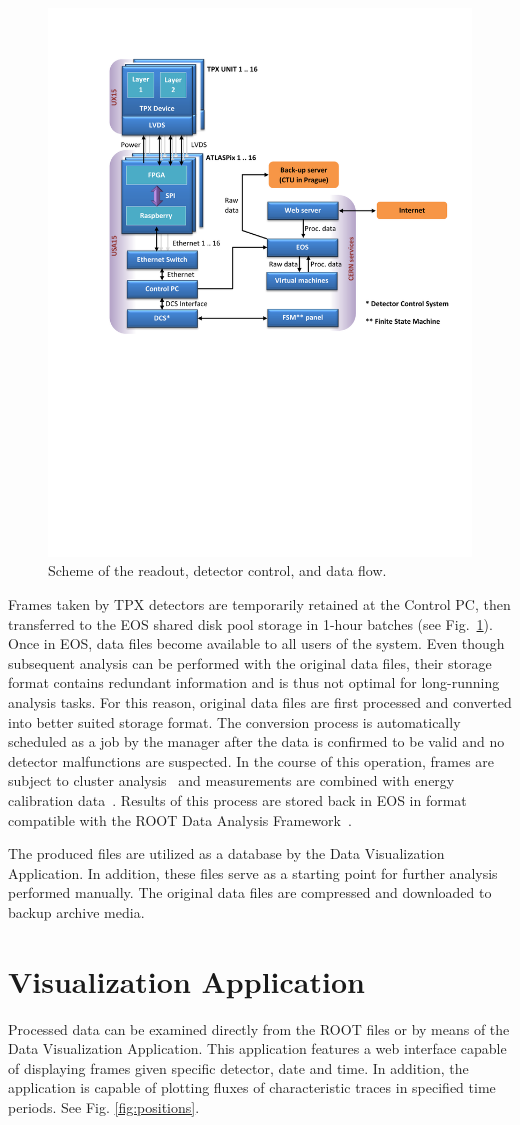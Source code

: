 \documentclass[journal]{IEEEtran}
\begin{document}
\begin{figure}[tbp]
	\centering
        \includegraphics[clip, trim={2cm 11.2cm 0cm 2.6cm}, width=.5\textwidth, angle = 0 ]{Plots/Doc1.pdf}
      \caption {Scheme of the readout, detector control, and data flow.}
    \label{fig:data_flow}
\end{figure}

Frames taken by TPX detectors are temporarily retained at the Control PC, then transferred to the EOS shared disk pool storage in 1-hour batches (see Fig.~\ref{fig:data_flow}). Once in EOS, data files become available to all users of the system. Even though subsequent analysis can be performed with the original data files, their storage format contains redundant information and is thus not optimal for long-running analysis tasks. For this reason, original data files are first processed and converted into better suited storage format. The conversion process is automatically scheduled as a job by the manager after the data is confirmed to be valid and no detector malfunctions are suspected. In the course of this operation, frames are subject to cluster analysis~\cite{Holy2008} and measurements are combined with energy calibration data~\cite{Jakubek2011}. Results of this process are stored back in EOS in format compatible with the ROOT Data Analysis Framework~\cite{ROOT}.

The produced files are utilized as a database by the Data Visualization Application. In addition, these files serve as a starting point for further analysis performed manually. The original data files are compressed and downloaded to backup archive media.

\section{\label{sec:dal}Visualization Application}
Processed data can be examined directly from the ROOT files or by means of the Data Visualization Application. \cite{Manek2016} This application features a web interface capable of displaying frames given specific detector, date and time. In addition, the application is capable of plotting fluxes of characteristic traces in specified time periods. See Fig. \ref{fig:positions}.
\end{document}
